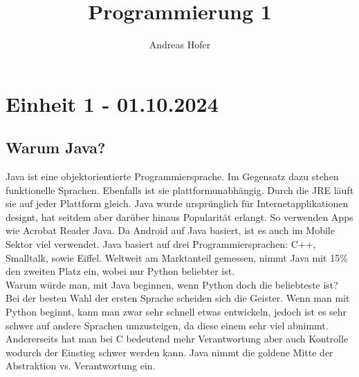 \documentclass{article}
\title{\vspace{-3cm}Programmierung 1}
\author{Andreas Hofer}
\begin{document}
	\maketitle
	\section{Einheit 1 - 01.10.2024}
	\subsection{Warum Java?}
	Java ist eine objektorientierte Programmiersprache. Im Gegensatz dazu stehen funktionelle Sprachen. Ebenfalls ist sie plattformunabhängig. Durch die JRE läuft sie auf jeder Plattform gleich. Java wurde ursprünglich für Internetapplikationen designt, hat seitdem aber darüber hinaus Popularität erlangt. So verwenden Apps wie Acrobat Reader Java. Da Android auf Java basiert, ist es auch im Mobile Sektor viel verwendet. Java basiert auf drei Programmiersprachen: C++, Smalltalk, sowie Eiffel. Weltweit am Marktanteil gemessen, nimmt Java mit 15\% den zweiten Platz ein, wobei nur Python beliebter ist. \\
	Warum würde man, mit Java beginnen, wenn Python doch die beliebteste ist? \\
	Bei der besten Wahl der ersten Sprache scheiden sich die Geister. Wenn man mit Python beginnt, kann man zwar sehr schnell etwas entwickeln, jedoch ist es sehr schwer auf andere Sprachen umzusteigen, da diese einem sehr viel abnimmt. Andererseits hat man bei C bedeutend mehr Verantwortung aber auch Kontrolle wodurch der Einstieg schwer werden kann. Java nimmt die goldene Mitte der Abstraktion vs. Verantwortung ein. \\
\end{document}
